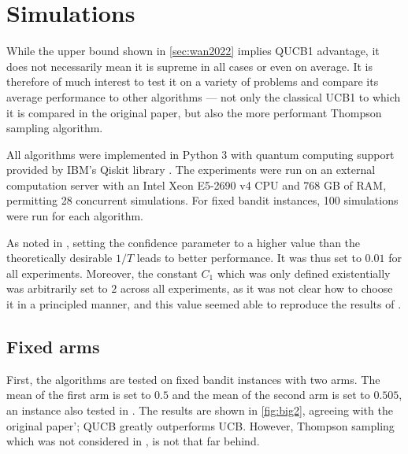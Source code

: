 \chapter{Simulations}
\label{sec:simulations}

While the upper bound shown in \cref{sec:wan2022} implies QUCB1 advantage, it does not necessarily mean it is supreme in all cases or even on average.
It is therefore of much interest to test it on a variety of problems and compare its average performance to other algorithms — not only the classical UCB1 to which it is compared in the original paper, but also the more performant Thompson sampling algorithm.

All algorithms were implemented in Python 3 \autocite{python} with quantum computing support provided by IBM's Qiskit library \autocite{qiskit}.
The experiments were run on an external computation server with an Intel Xeon E5-2690 v4 CPU and 768 GB of RAM, permitting 28 concurrent simulations.
For fixed bandit instances, 100 simulations were run for each algorithm.

As noted in \autocite{wan2022}, setting the confidence parameter to a higher value than the theoretically desirable $1/T$ leads to better performance.
It was thus set to $0.01$ for all experiments.
Moreover, the constant $C_1$ which was only defined existentially was arbitrarily set to $2$ across all experiments, as it was not clear how to choose it in a principled manner, and this value seemed able to reproduce the results of \autocite{wan2022}.

\section{Fixed arms}
First, the algorithms are tested on fixed bandit instances with two arms.
The mean of the first arm is set to $0.5$ and the mean of the second arm is set to $0.505$, an instance also tested in \autocite{wan2022}.
The results are shown in \cref{fig:big2}, agreeing with the original paper'; QUCB greatly outperforms UCB.
However, Thompson sampling which was not considered in \autocite{wan2022}, is not that far behind.

